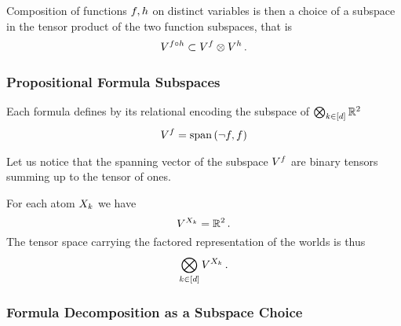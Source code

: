 Composition of functions $f,h$ on distinct variables is then a choice of a subspace in the tensor product of the two function subspaces, that is
\begin{align}
	V^{f\circ h} 
	\subset V^{f} \otimes V^{h} \, . 
\end{align}




\subsubsection{Propositional Formula Subspaces}



Each formula defines by its relational encoding the subspace of $\bigotimes_{k\in[d]}\mathbb{R}^2$
\begin{align}
	\subspaceof{\exformula} = \spanof{\lnot\exformula,\exformula} %
\end{align}

Let us notice that the spanning vector of the subspace $V^{f}$ are binary tensors summing up to the tensor of ones.


For each atom $X_{k}$ we have
	\[ V^{X_{k}} = \mathbb{R}^2 \, . \]
The tensor space carrying the factored representation of the worlds is thus
\begin{align}
	\bigotimes_{k\in[d]}V^{X_{k}} \, .
\end{align}

\subsubsection{Formula Decomposition as a Subspace Choice}


